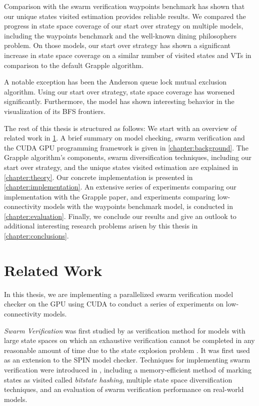 \documentclass[
fancyheadings, %
%
%
]{stsreprt}
\begin{document}
Comparison with the swarm verification waypoints benchmark has shown that our unique states visited estimation provides reliable results.
We compared the progress in state space coverage of our start over strategy on multiple models, including the waypoints benchmark and the well-known dining philosophers problem.
On those models, our start over strategy has shown a significant increase in state space coverage on a similar number of visited states and VTs in comparison to the default Grapple algorithm.

A notable exception has been the Anderson queue lock mutual exclusion algorithm.
Using our start over strategy, state space coverage has worsened significantly.
Furthermore, the model has shown interesting behavior in the visualization of its BFS frontiers.

The rest of this thesis is structured as follows:
We start with an overview of related work in \cref{chapter:related-work}.
A brief summary on model checking, swarm verification and the CUDA GPU programming framework is given in \cref{chapter:background}.
The Grapple algorithm's components, swarm diversification techniques, including our start over strategy, and the unique states visited estimation are explained in \cref{chapter:theory}.
Our concrete implementation is presented in \cref{chapter:implementation}.
An extensive series of experiments comparing our implementation with the Grapple paper, and experiments comparing low-connectivity models with the waypoints benchmark model, is conducted in \cref{chapter:evaluation}.
Finally, we conclude our results and give an outlook to additional interesting research problems arisen by this thesis in \cref{chapter:conclusions}.

\chapter{Related Work}
\label{chapter:related-work}

In this thesis, we are implementing a parallelized swarm verification model checker on the GPU using CUDA to conduct a series of experiments on low-connectivity models.

\emph{Swarm Verification} was first studied by \citeauthor*{Holzmann2008.Swarm-Verification} as verification method for models with large state spaces on which an exhaustive verification cannot be completed in any reasonable amount of time due to the state explosion problem \cite{Holzmann2008.Swarm-Verification}.
It was first used as an extension to the SPIN model checker.
Techniques for implementing swarm verification were introduced in \cite{Holzmann2011.Swarm-Verification-Techniques}, including a memory-efficient method of marking states as visited called \emph{bitstate hashing}, multiple state space diversification techniques, and an evaluation of swarm verification performance on real-world models.
\end{document}
